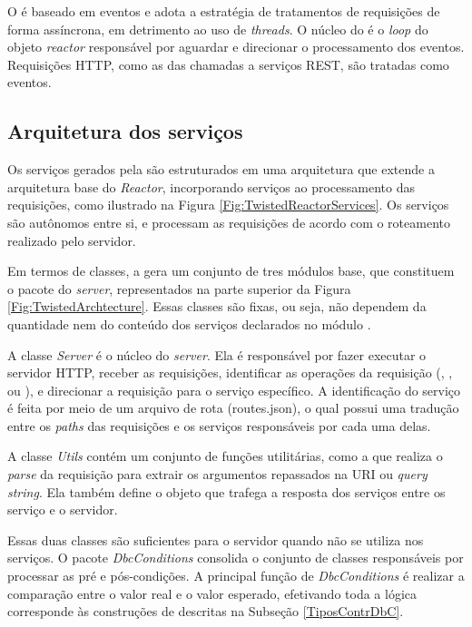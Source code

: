 O \twisted{} é baseado em eventos e adota a estratégia de tratamentos de
requisições de forma assíncrona, em detrimento ao uso de \textit{threads}. O
núcleo do \twisted{} é o \textit{loop} do objeto \emph{reactor} responsável por
aguardar e direcionar o processamento dos eventos. Requisições HTTP, como as das chamadas a serviços
REST, são tratadas como eventos.

\subsection{Arquitetura dos serviços \twisted{}}
\label{ArquiteturaTwisted}

Os serviços \twisted{} gerados pela \neoidl{} são estruturados em uma
arquitetura que extende a arquitetura base do \twisted{} \emph{Reactor},
incorporando serviços ao processamento das requisições, como ilustrado na Figura
\ref{Fig:TwistedReactorServices}. Os serviços são autônomos entre si, e
processam as requisições de acordo com o roteamento realizado pelo servidor.

Em termos de classes, a \neoidl{} gera um conjunto de tres módulos base,
que constituem o pacote do \twisted{} \textit{server}, representados na
parte superior da Figura \ref{Fig:TwistedArchtecture}. Essas classes são fixas,
ou seja, não dependem da quantidade nem do conteúdo dos serviços declarados no
módulo \neoidl{}.

A classe \emph{Server} é o núcleo do \twisted{} \textit{server}. Ela é
responsável por fazer executar o servidor HTTP, receber as requisições,
identificar as operações da requisição (, ,  ou ), e
direcionar a requisição para o serviço específico. A identificação do serviço é
feita por meio de um arquivo de rota (routes.json), o qual possui uma tradução
entre os \emph{paths} das requisições e os serviços responsáveis por cada uma
delas.

A classe \emph{Utils} contém um conjunto de funções utilitárias, como a que
realiza o \textit{parse} da requisição para extrair os argumentos repassados
na URI ou \textit{query string}. Ela também define o objeto que trafega a
resposta dos serviços entre os serviço e o servidor.

Essas duas classes são suficientes para o servidor quando não se utiliza
\designbycontract{} nos serviços. O pacote
\emph{DbcConditions} consolida o conjunto de classes res\-pon\-sá\-veis por
processar as pré e pós-condições. A principal função de \emph{DbcConditions} é realizar a
comparação entre o valor real e o valor esperado, efetivando toda a
lógica corresponde às construções de \designbycontract{} descritas na Subseção
\ref{TiposContrDbC}.

